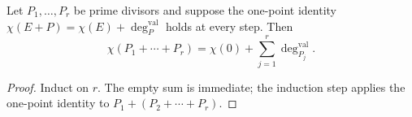 \begin{theorem}
  \label{mk-thm:adelic_chi_telescope_effective}
  \leanok

  Let \(P_1,\ldots,P_r\) be prime divisors and suppose the one-point
  identity
  \(\chi(E+P)=\chi(E)+\deg_P^{\mathrm{val}}\) holds at every step.  Then
  \[
    \chi(P_1+\cdots+P_r)
      =\chi(0)+\sum_{j=1}^r\deg_{P_j}^{\mathrm{val}}.
  \]
\end{theorem}
\begin{proof}
  \leanok
  Induct on \(r\).  The empty sum is immediate; the induction step applies
  the one-point identity to \(P_1+(P_2+\cdots+P_r)\).
\end{proof}

